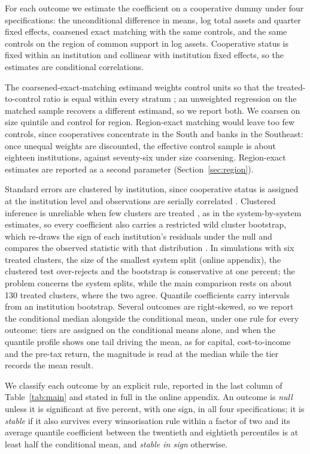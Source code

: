 \documentclass[11pt,a4paper]{article}
\begin{document}
For each outcome we estimate the coefficient on a cooperative dummy under four
specifications: the unconditional difference in means, log total assets and quarter fixed
effects, coarsened exact matching \citep{iacus2012} with the same controls, and the same
controls on the region of common support in log assets. Cooperative status is fixed
within an institution and collinear with institution fixed effects, so the estimates
are conditional correlations.

The coarsened-exact-matching estimand weights control units so that the
treated-to-control ratio is equal within every stratum \citep{iacus2012}; an unweighted
regression on the matched sample recovers a different estimand, so we report both. We coarsen on
size quintile and control for region. Region-exact matching would leave too few
controls, since cooperatives concentrate in the South and banks in the Southeast: once
unequal weights are discounted, the effective control sample is about eighteen
institutions, against seventy-six under size coarsening. Region-exact estimates are
reported as a second parameter (Section~\ref{sec:region}).

Standard errors are clustered by institution, since cooperative status is assigned at the
institution level and observations are serially correlated \citep{cameron2015}.
Clustered inference is unreliable when few clusters are treated \citep{mackinnon2017},
as in the system-by-system estimates, so every coefficient also carries a restricted
wild cluster bootstrap, which re-draws the sign of each institution's residuals under
the null and compares the observed statistic with that distribution \citep{cameron2008}.
In simulations with six treated clusters, the size of the smallest system split (online
appendix), the clustered test over-rejects and the bootstrap is conservative at one
percent; the problem concerns the system splits, while the main comparison rests on
about 130 treated clusters, where the two agree. Quantile
coefficients carry intervals from an institution bootstrap. Several outcomes are
right-skewed, so we report the conditional median alongside the conditional mean, under
one rule for every outcome: tiers are assigned on the conditional means alone, and when
the quantile profile shows one tail driving the mean, as for capital, cost-to-income and
the pre-tax return, the magnitude is read at the median while the tier records the mean
result.

We classify each outcome by an explicit rule, reported in the last column of
Table~\ref{tab:main} and stated in full in the online appendix. An outcome is
\textit{null} unless it is significant at five percent, with one sign, in all four
specifications; it is \textit{stable} if it also survives every winsorisation rule
within a factor of two and its average quantile coefficient between the twentieth and
eightieth percentiles is at least half the conditional mean, and \textit{stable in
sign} otherwise.
\end{document}
